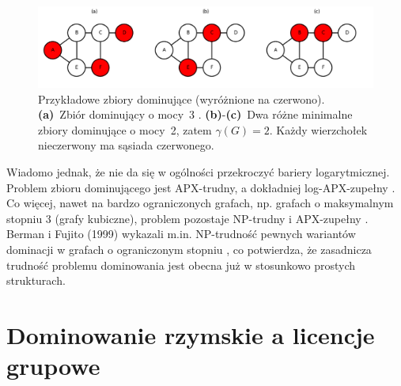 \begin{figure}[ht]
  \centering
  \includegraphics[width=1\textwidth]{assets/dominating-set-example.png}
  \caption[Przykładowe zbiory dominujące]{%
    Przykładowe zbiory dominujące (wyróżnione na czerwono).
    \textbf{(a)}~Zbiór dominujący o mocy~3 .
    \textbf{(b)}-\textbf{(c)}~Dwa różne minimalne zbiory dominujące o mocy~2, zatem
    \(\gamma(G)=2\).  Każdy wierzchołek nieczerwony ma sąsiada czerwonego.
  }
  \label{fig:dominatingexample}
\end{figure}

 \newpage
 Wiadomo jednak, że nie da się w ogólności przekroczyć bariery logarytmicznej. Problem zbioru dominującego jest APX-trudny, a dokładniej log-APX-zupełny \cite{POUREIDI2023106363}. Co więcej, nawet na bardzo ograniczonych grafach, np. grafach o maksymalnym stopniu 3 (grafy kubiczne), problem pozostaje NP-trudny i APX-zupełny \cite{ALIMONTI2000123}. Berman i Fujito (1999) wykazali m.in. NP-trudność pewnych wariantów dominacji w grafach o ograniczonym stopniu \cite{BermanFujitoThreeDegree}, co potwierdza, że zasadnicza trudność problemu dominowania jest obecna już w stosunkowo prostych strukturach.


\section{Dominowanie rzymskie a licencje grupowe}

